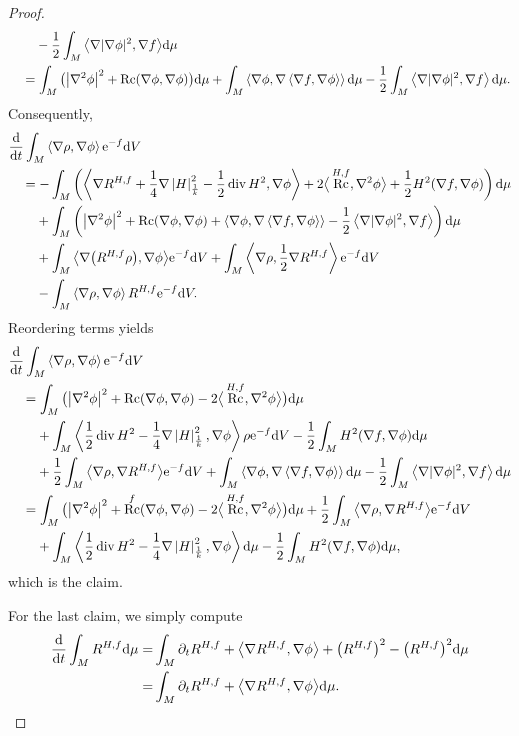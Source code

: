 \documentclass[pdftex]{sigma}
\numberwithin{equation}{section}
\newcommand{\del}{\partial}
\newcommand{\N}{\nabla}
\newcommand{\IP}[1]{\left<#1\right>}
\newcommand{\wnorm}[1]{\left|#1\right|^2_{\frac1k}}
\DeclareMathOperator{\Rc}{Rc}
\DeclareMathOperator{\divg}{div}
\begin{document}
\begin{proof}
\begin{align*}
 &\quad \phantom{={}}{} -\frac12\int_M \big\langle\N|\N\phi|^2,\N f\big\rangle {\rm d}\mu\\
	&\quad=\int_M \big(\big|\N^2\phi\big|^2+\Rc(\N\phi,\N\phi)\big) {\rm d}\mu +\int_M \IP{\N \phi,\N\IP{\N f,\N\phi}} {\rm d}\mu-\frac12\int_M \IP{\N|\N\phi|^2,\N f} {\rm d}\mu.
	\end{align*}
Consequently,
	\begin{align*}
	&\frac{{\rm d}}{{\rm d}t}\int_M \IP{\N\rho,\N\phi}{\rm e}^{-f} {\rm d}V\\
	&\quad=-\int_M \left(\IP{\N R^{H,f}+\frac1{4}\N\wnorm{H}-\frac12\divg H^2,\N\phi}+2\big\langle\Rc^{H,f},\N^2\phi\big\rangle+\frac12H^2(\N f,\N\phi) \right) {\rm d}\mu\\
	& \phantom{\quad={}}{} +\int_M \left(\big|\N^2\phi\big|^2+\Rc(\N\phi,\N\phi) + \IP{\N \phi,\N\IP{\N f,\N\phi}} -\frac12 \IP{\N|\N\phi|^2,\N f} \right) {\rm d}\mu\\
	& \phantom{\quad={}}{} +\int_M \big\langle\N\big(R^{H,f}\rho\big),\N \phi\big\rangle{\rm e}^{-f} {\rm d}V +\int_M \IP{\N\rho,\frac12\N R^{H,f}}{\rm e}^{-f} {\rm d}V \\
&\phantom{\quad={}}{}-\int_M \IP{\N\rho,\N\phi} R^{H,f} {\rm e}^{-f} {\rm d}V.
	\end{align*}
 Reordering terms yields
	\begin{align*}
	&\frac{{\rm d}}{{\rm d}t} \int_M \IP{\N\rho,\N\phi}{\rm e}^{-f} {\rm d}V\\
	&\quad=\int_M \big(\big|\N^2\phi\big|^2+\Rc(\N\phi,\N\phi)-2\big\langle\Rc^{H,f},\N^2\phi\big\rangle \big) {\rm d}\mu\\
	&\phantom{\quad={}}{}+\int_M \IP{\frac12\divg H^2-\frac1{4}\N\wnorm{H},\N \phi}\rho {\rm e}^{-f} {\rm d}V -\frac12\int_M H^2(\N f,\N\phi) {\rm d}\mu\\
 &\phantom{\quad={}}{}+\frac12\int_M \big\langle\N\rho,\N R^{H,f}\big\rangle{\rm e}^{-f} {\rm d}V
	+\int_M \IP{\N \phi,\N\IP{\N f,\N\phi}} {\rm d}\mu-\frac12\int_M \IP{\N|\N\phi|^2,\N f} {\rm d}\mu\\
	&\quad=\int_M \big(\big|\N^2\phi\big|^2+\Rc^f(\N\phi,\N\phi)-2\big\langle\Rc^{H,f},\N^2\phi\big\rangle\big) {\rm d}\mu +\frac12\int_M \big\langle\N\rho,\N R^{H,f}\big\rangle{\rm e}^{-f} {\rm d}V\\
 &\phantom{\quad={}}{}+\int_M \IP{\frac12\divg H^2-\frac1{4}\N\wnorm{H},\N \phi} {\rm d}\mu
	-\frac12\int_M H^2(\N f,\N\phi) {\rm d}\mu,
	\end{align*}
	which is the claim.
	
	For the last claim, we simply compute
	\begin{align*}
	\frac{{\rm d}}{{\rm d}t}\int_M R^{H,f} {\rm d}\mu=&\int_M \del_t R^{H,f}+\big\langle\N R^{H,f},\N\phi\big\rangle+\big(R^{H,f}\big)^2-\big(R^{H,f}\big)^2 {\rm d}\mu\\
	=&\int_M \del_t R^{H,f}+\big\langle\N R^{H,f},\N\phi\big\rangle {\rm d}\mu.\tag*{\qed}
	\end{align*} \renewcommand{\qed}{}
\end{proof}
\end{document}
